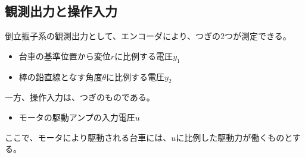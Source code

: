 \subsection{観測出力と操作入力}
倒立振子系の観測出力として、エンコーダにより、つぎの2つが測定できる。\\
\begin{itemize}
  \item 台車の基準位置から変位$r$に比例する電圧$y_{1}$
  \item 棒の鉛直線となす角度$\theta$に比例する電圧$y_{2}$
\end{itemize}
一方、操作入力は、つぎのものである。
\begin{itemize}
  \item モータの駆動アンプの入力電圧$u$
\end{itemize}
ここで、モータにより駆動される台車には、$u$に比例した駆動力が働くものとする。


